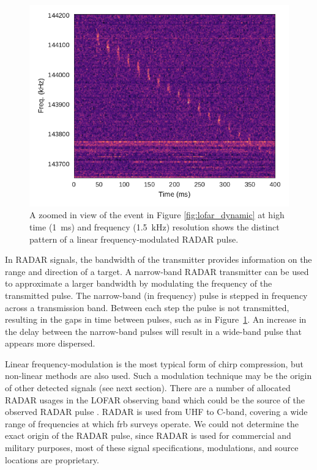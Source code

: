 \documentclass[a4paper,fleqn,usenatbib]{mnras}
\begin{document}
\begin{figure}
    \includegraphics[width=1.0\linewidth]{figures/LOFAR_dynamic_high_res.pdf}
    \caption{A zoomed in view of the event in Figure \ref{fig:lofar_dynamic} at
    high time (1~ms) and frequency (1.5~kHz) resolution shows the distinct
    pattern of a linear frequency-modulated RADAR pulse.
    }
    \label{fig:lofar_dynamic_high}
\end{figure}

In RADAR signals, the bandwidth of the transmitter provides information on
the range and direction of a target. A narrow-band RADAR transmitter can be used
to approximate a larger bandwidth by modulating the frequency of the transmitted
pulse. The narrow-band (in frequency) pulse is stepped in frequency across a
transmission band. Between each step the pulse is not transmitted, resulting in
the gaps in time between pulses, such as in Figure~\ref{fig:lofar_dynamic_high}.
An increase in the delay between the narrow-band pulses will result in a
wide-band pulse that appears more dispersed.

Linear frequency-modulation is the most typical form of chirp compression, but
non-linear methods are also used. Such a modulation technique may be the origin
of other detected signals (see next section).  There are a number of allocated
RADAR usages in the LOFAR observing band which could be the source of the
observed RADAR pulse \citep{ofcom2017}.  RADAR is used from UHF to C-band,
covering a wide range of frequencies at which \gls{frb} surveys operate. We
could not determine the exact origin of the RADAR pulse, since RADAR is used for
commercial and military purposes, most of these signal specifications,
modulations, and source locations are proprietary.
\end{document}
